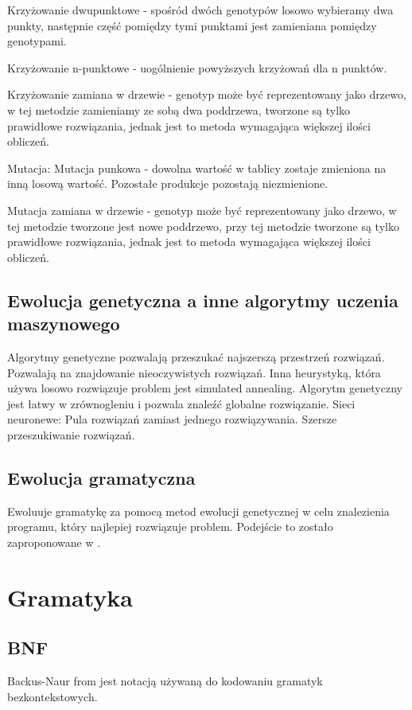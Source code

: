 Krzyżowanie dwupunktowe - spośród dwóch genotypów losowo wybieramy dwa punkty, następnie część pomiędzy tymi punktami jest zamieniana pomiędzy genotypami.

Krzyżowanie n-punktowe - uogólnienie powyższych krzyżowań dla n punktów.

Krzyżowanie zamiana w drzewie - genotyp może być reprezentowany jako drzewo, w tej metodzie zamieniamy ze sobą dwa poddrzewa, tworzone są tylko prawidłowe rozwiązania, jednak jest to metoda wymagająca większej ilości obliczeń. 


Mutacja:
Mutacja punkowa - dowolna wartość w tablicy zostaje zmieniona na inną losową wartość. Pozostałe produkcje pozostają niezmienione.

Mutacja zamiana w drzewie - genotyp może być reprezentowany jako drzewo, w tej metodzie tworzone jest nowe poddrzewo, przy tej metodzie tworzone są tylko prawidłowe rozwiązania, jednak jest to metoda wymagająca większej ilości obliczeń. 

 
  
\subsection{Ewolucja genetyczna a inne algorytmy uczenia maszynowego}
Algorytmy genetyczne pozwalają przeszukać najszerszą przestrzeń rozwiązań. Pozwalają na znajdowanie nieoczywistych rozwiązań.  
Inna heurystyką, która używa losowo rozwiązuje problem jest simulated annealing. Algorytm genetyczny jest łatwy w zrównogleniu i pozwala znaleźć globalne rozwiązanie.
Sieci neuronewe:
Pula rozwiązań zamiast jednego rozwiązywania. Szersze przeszukiwanie rozwiązań. 
\subsection{Ewolucja gramatyczna}
Ewoluuje gramatykę za pomocą metod ewolucji genetycznej w celu znalezienia programu, który najlepiej rozwiązuje problem.
Podejście to zostało zaproponowane w \cite{ryan_collins_neill_1998}. 


\section{Gramatyka}
\label{sec:gramatyka}
\subsection{BNF}
Backus-Naur from jest notacją używaną do kodowaniu gramatyk bezkontekstowych.

